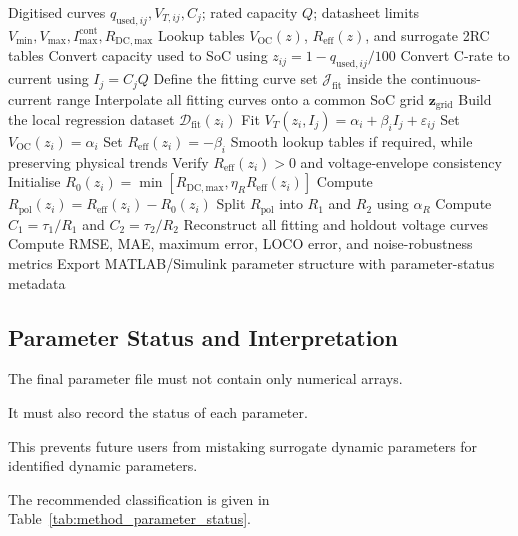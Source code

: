 \documentclass[a4paper,12pt]{article}
\newcommand{\mat}[1]{\mathbf{#1}}
\begin{document}
\begin{algorithm}[H]
\caption{Datasheet-based ECM parameter identification}
\label{alg:datasheet_ecm_identification}
\begin{algorithmic}[1]
\Require Digitised curves \(q_{\mathrm{used},ij},V_{T,ij},C_j\); rated capacity \(Q\); datasheet limits \(V_{\min},V_{\max},I_{\max}^{\mathrm{cont}},R_{\mathrm{DC,max}}\)
\Ensure Lookup tables \(V_{\mathrm{OC}}(z)\), \(R_{\mathrm{eff}}(z)\), and surrogate 2RC tables
\State Convert capacity used to SoC using \(z_{ij}=1-q_{\mathrm{used},ij}/100\)
\State Convert C-rate to current using \(I_j=C_jQ\)
\State Define the fitting curve set \(\mathcal{J}_{\mathrm{fit}}\) inside the continuous-current range
\State Interpolate all fitting curves onto a common SoC grid \(\mat{z}_{\mathrm{grid}}\)
    \State Build the local regression dataset \(\mathcal{D}_{\mathrm{fit}}(z_i)\)
    \State Fit \(V_T(z_i,I_j)=\alpha_i+\beta_iI_j+\varepsilon_{ij}\)
    \State Set \(V_{\mathrm{OC}}(z_i)=\alpha_i\)
    \State Set \(R_{\mathrm{eff}}(z_i)=-\beta_i\)
\EndFor
\State Smooth lookup tables if required, while preserving physical trends
\State Verify \(R_{\mathrm{eff}}(z_i)>0\) and voltage-envelope consistency
\State Initialise \(R_0(z_i)=\min[R_{\mathrm{DC,max}},\eta_RR_{\mathrm{eff}}(z_i)]\)
\State Compute \(R_{\mathrm{pol}}(z_i)=R_{\mathrm{eff}}(z_i)-R_0(z_i)\)
\State Split \(R_{\mathrm{pol}}\) into \(R_1\) and \(R_2\) using \(\alpha_R\)
\State Compute \(C_1=\tau_1/R_1\) and \(C_2=\tau_2/R_2\)
\State Reconstruct all fitting and holdout voltage curves
\State Compute RMSE, MAE, maximum error, LOCO error, and noise-robustness metrics
\State Export MATLAB/Simulink parameter structure with parameter-status metadata
\end{algorithmic}
\end{algorithm}

\subsection{Parameter Status and Interpretation}

The final parameter file must not contain only numerical arrays.

It must also record the status of each parameter.

This prevents future users from mistaking surrogate dynamic parameters for identified dynamic parameters.

The recommended classification is given in Table~\ref{tab:method_parameter_status}.
\end{document}
